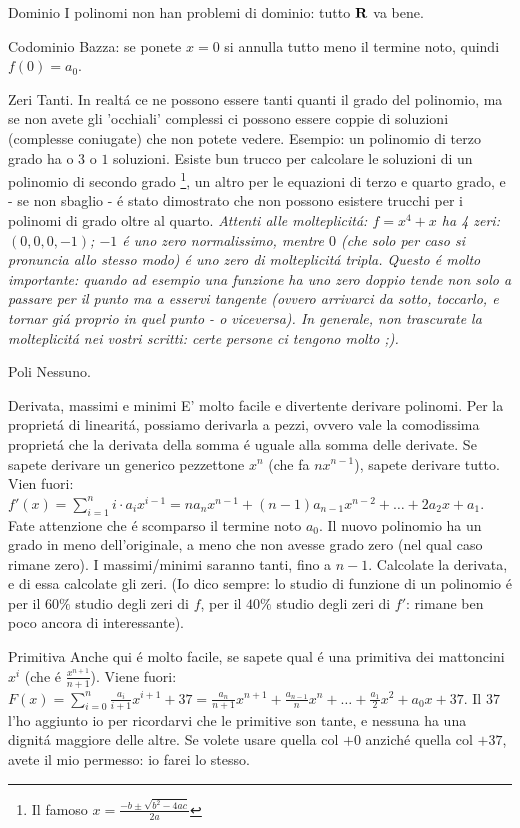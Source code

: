 \begin{description}
	\item{Dominio} I polinomi non han problemi di dominio: tutto $\mathbf{R}$ va bene.
	\item{Codominio} Bazza: se ponete $x=0$ si annulla tutto meno il termine noto, quindi $f(0)=a_0$.
	\item{Zeri} Tanti. In realt\'a ce ne possono essere tanti quanti il grado del polinomio, ma se non avete
	gli 'occhiali' complessi ci possono essere coppie di soluzioni (complesse coniugate) che non potete vedere.
	Esempio: un polinomio di terzo grado ha o $3$ o $1$ soluzioni. Esiste bun trucco per calcolare le soluzioni
	di un polinomio di secondo grado \footnote{Il famoso $x=\frac{-b \pm \sqrt{b^2-4ac}}{2a}$}, un altro per le
	equazioni di terzo e quarto grado, e - se non sbaglio - \'e stato dimostrato che non possono esistere trucchi
	per i polinomi di grado oltre al quarto. {\em Attenti alle molteplicit\'a: $f=x^4+x$ ha 4 zeri: $(0,0,0,-1)$;
	$-1$ \'e uno zero normalissimo, mentre $0$ (che solo per caso si pronuncia allo stesso modo) \'e uno zero di
	molteplicit\'a tripla. Questo \'e molto importante: quando ad esempio una funzione ha uno zero doppio tende
	non solo a passare per il punto ma a esservi tangente (ovvero arrivarci da sotto, toccarlo, e tornar gi\'a
	proprio in quel punto - o viceversa). In generale, non trascurate la molteplicit\'a nei vostri scritti: certe
	persone ci tengono molto ;).}
	\item{Poli} Nessuno.
	\item{Derivata, massimi e minimi} E' molto facile e divertente derivare polinomi. Per la propriet\'a di linearit\'a,
		possiamo derivarla a pezzi, ovvero vale la comodissima propriet\'a che la derivata della somma \'e uguale alla somma
		delle derivate. Se sapete derivare un generico pezzettone $x^n$ (che fa $nx^{n-1}$), sapete derivare tutto. Vien
		fuori: $f'(x)=\sum_{i=1}^n i \cdot a_ix^{i-1} = na_nx^{n-1}+(n-1)a_{n-1}x^{n-2}+\ldots+2a_2x+a_1$. Fate attenzione
		che \'e scomparso il termine noto $a_0$. Il nuovo polinomio ha un grado in meno dell'originale, a meno che non
		avesse grado zero (nel qual caso rimane zero). I massimi/minimi saranno tanti, fino a $n-1$. Calcolate la derivata,
		e di essa calcolate gli zeri. (Io dico sempre: lo studio di funzione di un polinomio \'e per il $60\%$ studio degli
		zeri di $f$, per il $40\%$ studio degli zeri di $f'$: rimane ben poco ancora di interessante).
	\item{Primitiva} Anche qui \'e molto facile, se sapete qual \'e una primitiva dei mattoncini $x^i$ (che \'e $\frac{x^{n+1}}{n+1}$).
		Viene fuori: $F(x)=\sum_{i=0}^n \frac{a_i}{i+1}x^{i+1}+37 = \frac{a_n}{n+1}x^{n+1}+\frac{a_{n-1}}{n}x^{n}+\ldots+\frac{a_1}{2}x^2+a_0x+37$.
		Il $37$ l'ho aggiunto io per ricordarvi che le primitive son tante, e nessuna ha una dignit\'a maggiore delle altre. Se volete usare
		quella col $+0$ anzich\'e quella col $+37$, avete il mio permesso: io farei lo stesso.
\end{description}


